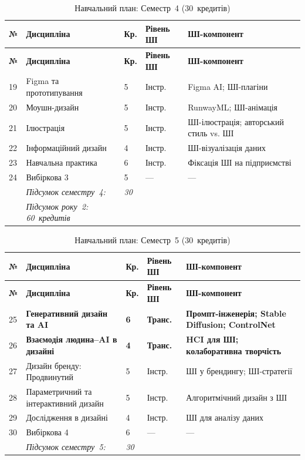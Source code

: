 \begin{longtable}{@{}p{}p{}p{}p{}p{}@{}}
\caption{Навчальний план: Семестр~4 (30~кредитів)}\label{tab:app-sem4} \\
\hline
\textbf{№} & \textbf{Дисципліна} & \textbf{Кр.} & \textbf{Рівень ШІ} & \textbf{ШІ-компонент} \\
\hline
\endfirsthead
\hline
\textbf{№} & \textbf{Дисципліна} & \textbf{Кр.} & \textbf{Рівень ШІ} & \textbf{ШІ-компонент} \\
\hline
\endhead
19 & Figma та прототипування & 5 & Інстр. & Figma AI; ШІ-плагіни \\
20 & Моушн-дизайн & 5 & Інстр. & RunwayML; ШІ-анімація \\
21 & Ілюстрація & 5 & Інстр. & ШІ-ілюстрація; авторський стиль vs. ШІ \\
22 & Інформаційний дизайн & 4 & Інстр. & ШІ-візуалізація даних \\
23 & Навчальна практика & 6 & Інстр. & Фіксація ШІ на підприємстві \\
24 & Вибіркова 3 & 5 & --- & --- \\
\addlinespace
& \textit{Підсумок семестру~4:} & \textit{30} & & \\
& \textit{Підсумок року~2: 60~кредитів} & & & \\
\hline
\end{longtable}

\begin{longtable}{@{}p{}p{}p{}p{}p{}@{}}
\caption{Навчальний план: Семестр~5 (30~кредитів)}\label{tab:app-sem5} \\
\hline
\textbf{№} & \textbf{Дисципліна} & \textbf{Кр.} & \textbf{Рівень ШІ} & \textbf{ШІ-компонент} \\
\hline
\endfirsthead
\hline
\textbf{№} & \textbf{Дисципліна} & \textbf{Кр.} & \textbf{Рівень ШІ} & \textbf{ШІ-компонент} \\
\hline
\endhead
25 & \textbf{Генеративний дизайн та AI} & \textbf{6} & \textbf{Транс.} & \textbf{Промпт-інженерія; Stable Diffusion; ControlNet} \\
26 & \textbf{Взаємодія людина--AI в дизайні} & \textbf{4} & \textbf{Транс.} & \textbf{HCI для ШІ; колаборативна творчість} \\
27 & Дизайн бренду: Продвинутий & 5 & Інстр. & ШІ у брендингу; ШІ-стратегії \\
28 & Параметричний та інтерактивний дизайн & 5 & Інстр. & Алгоритмічний дизайн з ШІ \\
29 & Дослідження в дизайні & 4 & Інстр. & ШІ для аналізу даних \\
30 & Вибіркова 4 & 6 & --- & --- \\
\addlinespace
& \textit{Підсумок семестру~5:} & \textit{30} & & \\
\hline
\end{longtable}

